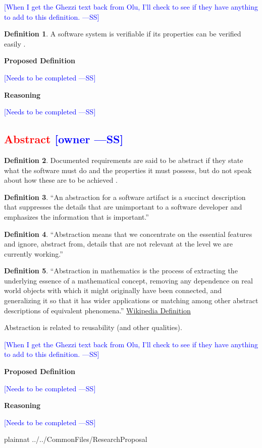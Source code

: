 \documentclass[letterpaper,cleveref]{lipics-v2019}
\newcommand{\authornote}[3]{\textcolor{#1}{[#3 ---#2]}}
\newcommand{\authornote}[3]{}
\newcommand{\wss}[1]{\authornote{blue}{SS}{#1}} %
\newcommand{\notdone}[1]{\textcolor{red}{#1}}
\theoremstyle{definition}
\newtheorem{defn}{Definition}
\begin{document}
\wss{When I get the Ghezzi text back from Olu, I'll check to see if they have
  anything to add to this definition.}

\begin{defn}
  A software system is verifiable if its properties can be verified easily
  \citep{ghezzi1991fundamentals}.
\end{defn}

\noindent \textbf{Proposed Definition} 

\wss{Needs to be completed}

\noindent \textbf{Reasoning}

\wss{Needs to be completed}

\subsection{\notdone{Abstract} \wss{owner}}

\begin{defn}
  Documented requirements are said to be abstract if they state what the
  software must do and the properties it must possess, but do not speak about
  how these are to be achieved \citep{GhezziEtAl2003}.
\end{defn}

\begin{defn}
  ``An abstraction for a software artifact is a succinct description that
  suppresses the details that are unimportant to a software developer and
  emphasizes the information that is important.'' \citep{Krueger1992}
\end{defn}

\begin{defn}
  ``Abstraction means that we concentrate on the essential features and ignore,
  abstract from, details that are not relevant at the level we are currently
  working.''  \citep[p.\ 296]{VanVliet2000}
\end{defn}

\begin{defn}
  ``Abstraction in mathematics is the process of extracting the underlying
  essence of a mathematical concept, removing any dependence on real world
  objects with which it might originally have been connected, and generalizing
  it so that it has wider applications or matching among other abstract
  descriptions of equivalent phenomena.''
  \href{https://en.wikipedia.org/wiki/Abstraction_(mathematics)} {Wikipedia
    Definition}
\end{defn}

Abstraction is related to reusability (and other qualities).

\wss{When I get the Ghezzi text back from Olu, I'll check to see if they have
  anything to add to this definition.}

\noindent \textbf{Proposed Definition} 

\wss{Needs to be completed}

\noindent \textbf{Reasoning}

\wss{Needs to be completed}

\newpage

 {plainnat}
 {../../CommonFiles/ResearchProposal}
\end{document}
